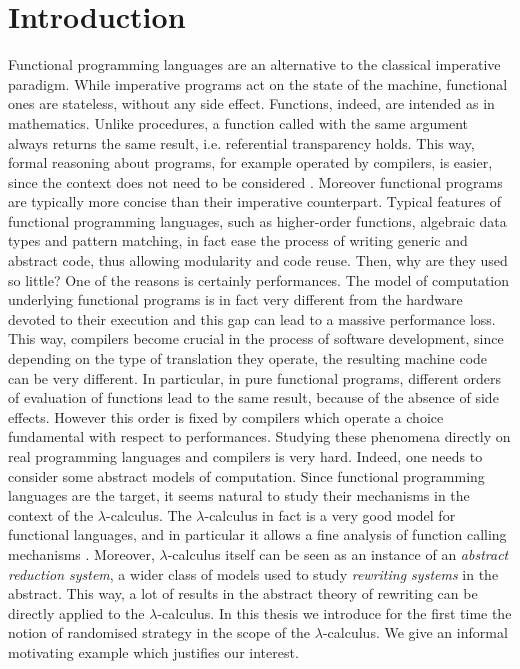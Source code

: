 \chapter{Introduction}\label{ch:introduction}
Functional programming languages are an alternative to the classical imperative paradigm. While imperative programs act on the state of the machine, functional ones are stateless, without any side effect. Functions, indeed, are intended as in mathematics. Unlike procedures, a function called with the same argument always returns the same result, i.e. referential transparency holds. This way, formal reasoning about programs, for example operated by compilers, is easier, since the context does not need to be considered \cite{backus_can_1978}. Moreover functional programs are typically more concise than their imperative counterpart. Typical features of functional programming languages, such as higher-order functions, algebraic data types and pattern matching, in fact ease the process of writing generic and abstract code, thus allowing modularity and code reuse. Then, why are they used so little? One of the reasons is certainly performances. The model of computation underlying functional programs is in fact very different from the hardware devoted to their execution and this gap can lead to a massive performance loss. This way, compilers become crucial in the process of software development, since depending on the type of translation they operate, the resulting machine code can be very different. In particular, in pure functional programs, different orders of evaluation of functions lead to the same result, because of the absence of side effects. However this order is fixed by compilers which operate a choice fundamental with respect to performances. Studying these phenomena directly on real programming languages and compilers is very hard. Indeed, one needs to consider some abstract models of computation. Since functional programming languages are the target, it seems natural to study their mechanisms in the context of the $\lambda$-calculus. The $\lambda$-calculus in fact is a very good model for functional languages, and in particular it allows a fine analysis of function calling mechanisms \cite{plotkin_call-by-name_1975}. Moreover, $\lambda$-calculus itself can be seen as an instance of an \emph{abstract reduction system}, a wider class of models used to study \emph{rewriting systems} in the abstract. This way, a lot of results in the abstract theory of rewriting can be directly applied to the $\lambda$-calculus. In this thesis we introduce for the first time the notion of randomised strategy in the scope of the $\lambda$-calculus. We give an informal motivating example which justifies our interest.
